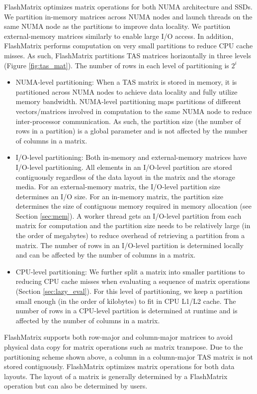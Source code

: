 FlashMatrix optimizes matrix operations for both NUMA architecture and SSDs.
We partition in-memory matrices across NUMA nodes and launch threads on
the same NUMA node as the partitions to improve data locality. We partition
external-memory matrices similarly to enable large I/O access. In addition,
FlashMatrix performs computation on very small partitions to reduce CPU cache
misses. As such, FlashMatrix partitions TAS matrices horizontally in three
levels (Figure \ref{fig:tas_mat}).
The number of rows in each level of partitioning is $2^i$
\begin{itemize}
\item NUMA-level partitioning: When a TAS
matrix is stored in memory, it is partitioned across NUMA nodes to achieve
data locality and fully utilize memory bandwidth. NUMA-level partitioning
maps partitions of different vectors/matrices involved in computation
to the same NUMA node to reduce inter-processor communication. As such,
the partition size (the number of rows in a partition) is a global parameter
and is not affected by the number of columns in a matrix.
\item I/O-level partitioning: Both in-memory and external-memory matrices have
I/O-level partitioning.
All elements in an I/O-level partition are stored contiguously regardless of
the data layout in the matrix and the storage media.
For an external-memory matrix, the I/O-level partition size determines an I/O
size. For an in-memory matrix, the partition size determines the size of
contiguous memory required in memory allocation (see Section \ref{sec:mem}).
A worker thread gets an I/O-level partition from each
matrix for computation and the partition size needs to be relatively large
(in the order of megabytes) to reduce overhead of retrieving a partition from
a matrix. The number of rows in an I/O-level partition is determined locally
and can be affected by the number of columns in a matrix. 
\item CPU-level partitioning: We further split a matrix into smaller partitions
to reducing CPU cache misses when evaluating a sequence of matrix operations
(Section \ref{sec:lazy_eval}). For this level of partitioning, we keep
a partition small enough (in the order of kilobytes) to fit in CPU L1/L2 cache.
The number of rows in a CPU-level partition is determined at runtime and
is affected by the number of columns in a matrix.
\end{itemize}

FlashMatrix supports both row-major and column-major matrices to avoid physical
data copy for matrix operations such as matrix transpose. Due to
the partitioning scheme shown above, a column in a column-major TAS matrix
is not stored contiguously. FlashMatrix optimizes matrix operations for both
data layouts. The layout of a matrix is generally
determined by a FlashMatrix operation but can also be determined by users. 

